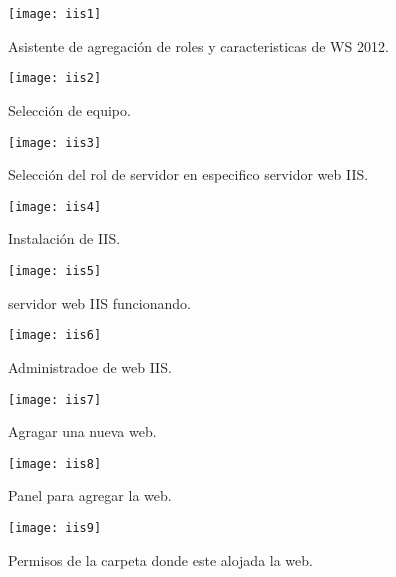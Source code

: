 \documentclass[a4paper, 11pt]{article} %
\begin{document}
\begin{figure}[h]
\centering 
\texttt{[image: iis1]} 
\caption{Asistente de agregación de roles y caracteristicas de WS 2012.} 
\vspace{-0.5cm}
\label{contexto:figura} 
\end{figure}
\begin{figure}[h]
\centering 
\texttt{[image: iis2]} 
\caption{Selección de equipo.} 
\vspace{-0.5cm}
\label{contexto:figura} 
\end{figure}
\begin{figure}[h]
\centering 
\texttt{[image: iis3]} 
\caption{Selección del rol de servidor en especifico servidor web IIS.} 
\vspace{-0.5cm}
\label{contexto:figura} 
\end{figure}
\begin{figure}[h]
\centering 
\texttt{[image: iis4]} 
\caption{Instalación de IIS.} 
\vspace{-0.5cm}
\label{contexto:figura} 
\end{figure}
\begin{figure}[h]
\centering 
\texttt{[image: iis5]} 
\caption{servidor web IIS funcionando.} 
\vspace{-0.5cm}
\label{contexto:figura} 
\end{figure}
\begin{figure}[h]
\centering 
\texttt{[image: iis6]} 
\caption{Administradoe de web IIS.} 
\vspace{-0.5cm}
\label{contexto:figura} 
\end{figure}
\begin{figure}[h]
\centering 
\texttt{[image: iis7]} 
\caption{Agragar una nueva web.} 
\vspace{-0.5cm}
\label{contexto:figura} 
\end{figure}
\begin{figure}[h]
\centering 
\texttt{[image: iis8]} 
\caption{Panel para agregar la web.} 
\vspace{-0.5cm}
\label{contexto:figura} 
\end{figure}
\begin{figure}[h]
\centering 
\texttt{[image: iis9]} 
\caption{Permisos de la carpeta donde este alojada la web.} 
\vspace{-0.5cm}
\label{contexto:figura} 
\end{figure}
\end{document}
